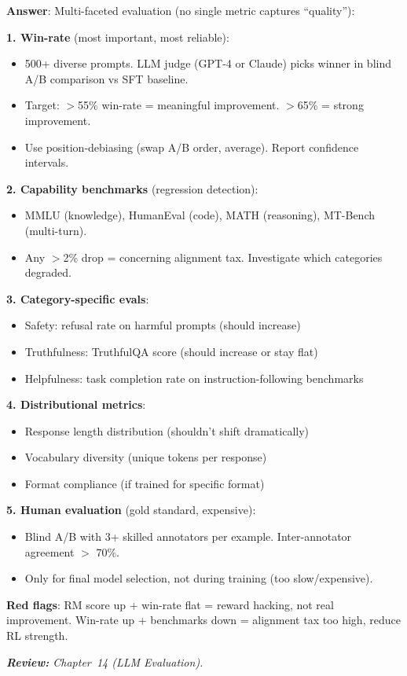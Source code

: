 \begin{questionbox}
\textbf{Answer}: Multi-faceted evaluation (no single metric captures ``quality''):

\textbf{1. Win-rate} (most important, most reliable):

\begin{itemize}
  \item 500+ diverse prompts. LLM judge (GPT-4 or Claude) picks winner in blind A/B comparison vs SFT baseline.
  \item Target: $>$55\% win-rate = meaningful improvement. $>$65\% = strong improvement.
  \item Use position-debiasing (swap A/B order, average). Report confidence intervals.
\end{itemize}

\textbf{2. Capability benchmarks} (regression detection):

\begin{itemize}
  \item MMLU (knowledge), HumanEval (code), MATH (reasoning), MT-Bench (multi-turn).
  \item Any $>$2\% drop = concerning alignment tax. Investigate which categories degraded.
\end{itemize}

\textbf{3. Category-specific evals}:

\begin{itemize}
  \item Safety: refusal rate on harmful prompts (should increase)
  \item Truthfulness: TruthfulQA score (should increase or stay flat)
  \item Helpfulness: task completion rate on instruction-following benchmarks
\end{itemize}

\textbf{4. Distributional metrics}:

\begin{itemize}
  \item Response length distribution (shouldn’t shift dramatically)
  \item Vocabulary diversity (unique tokens per response)
  \item Format compliance (if trained for specific format)
\end{itemize}

\textbf{5. Human evaluation} (gold standard, expensive):

\begin{itemize}
  \item Blind A/B with 3+ skilled annotators per example. Inter-annotator agreement $>$ 70\%.
  \item Only for final model selection, not during training (too slow/expensive).
\end{itemize}

\textbf{Red flags}: RM score up + win-rate flat = reward hacking, not real improvement. Win-rate up + benchmarks down = alignment tax too high, reduce RL strength.

\emph{\textbf{Review:} Chapter~14 (LLM Evaluation).}
\end{questionbox}

